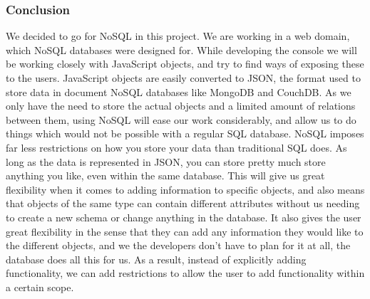 \subsubsection{Conclusion}
We decided to go for NoSQL in this project. We are working in a web domain, which NoSQL databases were designed for. While developing the console we will be working closely with JavaScript objects, and try to find ways of exposing these to the users. JavaScript objects are easily converted to JSON, the format used to store data in document NoSQL databases like MongoDB and CouchDB.  As we only have the need to store the actual objects and a limited amount of relations between them, using NoSQL will ease our work considerably, and allow us to do things which would not be possible with a regular SQL database. NoSQL imposes far less restrictions on how you store your data than traditional SQL does. As long as the data is represented in JSON, you can store pretty much store anything you like, even within the same database. This will give us great flexibility when it comes to adding information to specific objects, and also means that objects of the same type can contain different attributes without us needing to create a new schema or change anything in the database. It also gives the user great flexibility in the sense that they can add any information they would like to the different objects, and we the developers don't have to plan for it at all, the database does all this for us. As a result, instead of explicitly adding functionality, we can add restrictions to allow the user to add functionality within a certain scope.

